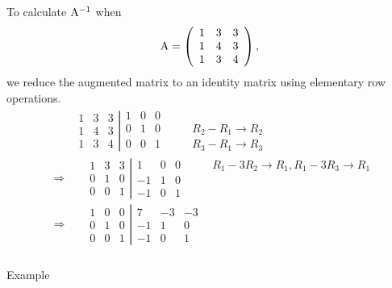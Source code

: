 \documentclass[
  letterpaper,
  DIV=11,
  numbers=noendperiod]{scrartcl}
\makeatletter
\let\oldsubparagraph\subparagraph
\renewcommand{\subparagraph}{
    \@ifstar
      \xxxSubParagraphStar
      \xxxSubParagraphNoStar
  }
\newcommand{\xxxSubParagraphStar}[1]{\oldsubparagraph*{#1}\mbox{}}
\newcommand{\xxxSubParagraphNoStar}[1]{\oldsubparagraph{#1}\mbox{}}
\theoremstyle{remark}
\makeatother
\begin{document}
To calculate \({\rm A}^{-1}\) when \[{\rm A} =\left( \begin{array}{rrr}
 1  & 3  & 3  \\
 1  & 4  & 3  \\
 1  & 3  & 4  
\end{array} \right),\] we reduce the augmented matrix to an identity
matrix using elementary row operations. \[\begin{aligned}
& &\left. \begin{array}{rrr}
 1  & 3  & 3  \\
 1  & 4  & 3  \\
 1  & 3 & 4  
\end{array}  \right| \begin{array}{rrrr}
 1  & 0  & 0  & \qquad  \\
 0  & 1  & 0  & \qquad R_{2} - R_{1}\rightarrow R_{2}\\
 0  & 0  & 1  & \qquad R_{3} - R_{1}\rightarrow R_{3}
\end{array} \\
&\Rightarrow& \quad  \left. \begin{array}{rrr}
 1  & 3  & 3  \\
 0  & 1  & 0  \\
 0 & 0 & 1 
\end{array}  \right| \begin{array}{rrrr}
 1  & 0  & 0  & \qquad  R_{1} - 3 R_{2}\rightarrow R_{1}, R_{1}- 3R_{3}\rightarrow R_{1}\\
 -1  & 1  & 0  & \qquad \\
 -1  & 0  & 1  & \qquad 
\end{array}\\
&\Rightarrow& \quad  \left. \begin{array}{rrr}
 1  & 0  & 0  \\
 0  & 1  & 0  \\
 0 & 0 & 1 
\end{array}  \right| \begin{array}{rrrr}
 7  & -3  & -3  & \qquad  \\
 -1  & 1  & 0  & \qquad \\
 -1  & 0  & 1  & \qquad 
\end{array} 
\end{aligned}\]

\subparagraph{Example}\label{example-5}
\end{document}
